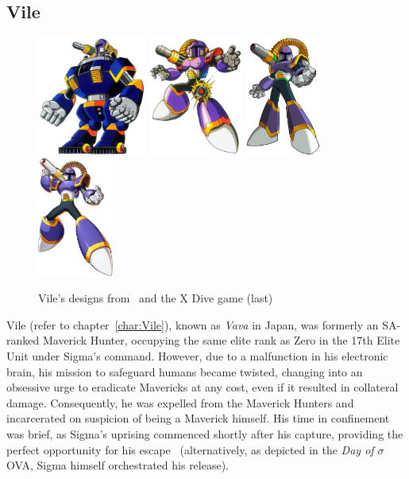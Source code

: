\subsection{Vile}\label{boss:vile}
\begin{figure}[htp]
	\centering
	\includegraphics[height=3.9cm]{figures/X1/Sigma_stages/VileRideArmor.jpg}
	\includegraphics[height=3.9cm]{figures/X1/Sigma_stages/Vile.jpg}
	\includegraphics[height=3.9cm]{figures/X1/Sigma_stages/MhxVile.png}	
	\includegraphics[height=3.9cm]{figures/X1/Sigma_stages/X_DiVE_Vile.png}
	\caption{Vile's designs from~\cite{book:MMX_Complete_art} and the X Dive game (last)}
\end{figure}

Vile (refer to chapter~\ref{char:Vile}), known as \textit{Vava} in Japan, was formerly an SA-ranked Maverick Hunter, occupying the same elite rank as Zero in the 17th Elite Unit under Sigma's command. However, due to a malfunction in his electronic brain, his mission to safeguard humans became twisted, changing into an obsessive urge to eradicate Mavericks at any cost, even if it resulted in collateral damage. Consequently, he was expelled from the Maverick Hunters and incarcerated on suspicion of being a Maverick himself. His time in confinement was brief, as Sigma's uprising commenced shortly after his capture, providing the perfect opportunity for his escape~\cite{Xcoll1:Manual_X1,MHX:manual, wayback:X_resources} (alternatively, as depicted in the \textit{Day of $\sigma$} OVA, Sigma himself orchestrated his release).

